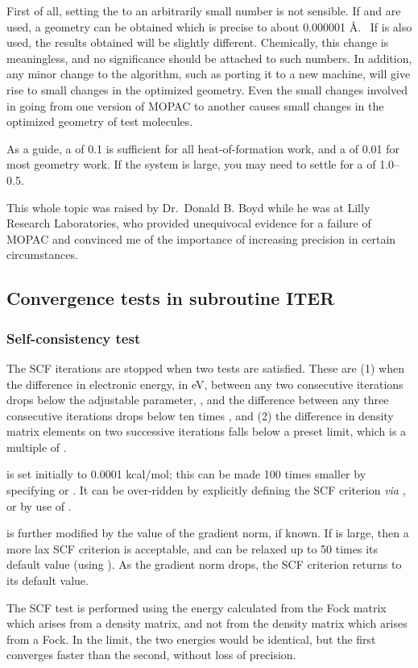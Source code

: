  First of all, setting  the  to an
arbitrarily  small  number  is not  sensible.   If  and
 are used, a geometry can be obtained which is precise to about 
0.000001 \AA. \ If  is also used, the results obtained will be
slightly different. Chemically, this change is meaningless, and no 
significance  should  be attached  to  such  numbers.   In  addition,  any 
minor  change  to the algorithm, such as porting it to a new machine, will give
rise to  small changes  in  the optimized geometry.  Even the small changes
involved in going from one version of MOPAC to another causes  small  changes 
in  the optimized geometry of test molecules.

As a guide, a  of 0.1 is sufficient for all  heat-of-formation
work,  and  a    of  0.01 for most geometry work.  If the system is
large, you may need to settle for a  of 1.0--0.5.

This whole topic was raised by Dr.\ Donald B. Boyd while he was at Lilly
Research  Laboratories,  who provided unequivocal evidence for a failure of
MOPAC and convinced me of the importance of increasing  precision  in certain
circumstances.

\subsection{Convergence tests in subroutine ITER}
\subsubsection{Self-consistency test}
The SCF iterations are stopped when two tests are satisfied.  These are (1)
when the difference in electronic energy, in eV, between any two consecutive
iterations drops below the adjustable parameter, , and the 
difference between any three consecutive iterations drops below ten times
, and (2) the difference in density matrix elements  on  two
successive iterations falls below a preset limit, which is a multiple of
. 

 is set initially to 0.0001 kcal/mol; this can be  made  100
times  smaller by specifying  or .   It can be
over-ridden by explicitly defining the SCF criterion {\em via}
, or by use of .

 is further modified by the value of the  gradient  norm,  if
known.   If   is large, then a more lax SCF criterion is
acceptable, and  can be relaxed up to 50 times its  default  value
(using ).   As  the gradient norm drops, the SCF criterion
returns to its default value.

The SCF test is performed using the energy calculated from the Fock matrix 
which  arises  from  a  density matrix, and not from the density matrix which
arises from a Fock.  In the limit, the two  energies  would be  identical, 
but  the first converges faster than the second, without loss of precision.
